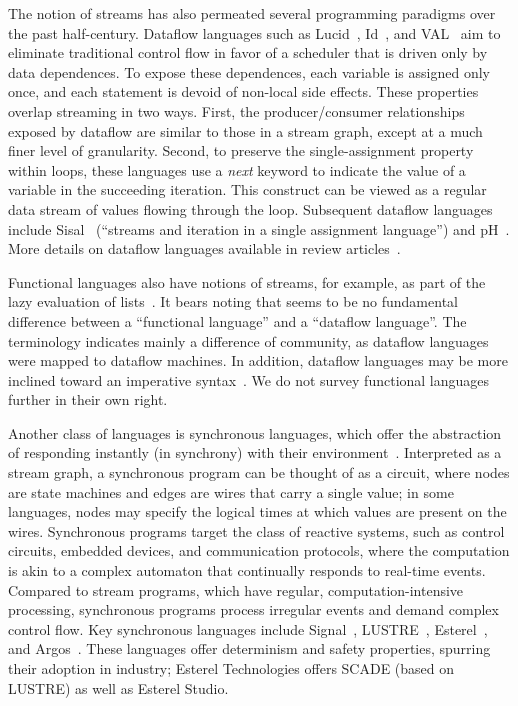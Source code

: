 The notion of streams has also permeated several programming paradigms
over the past half-century.  Dataflow languages such as
Lucid~\cite{ashcroft_lucidnonprocedural_1977},
Id~\cite{arvind_asynchronous_1978,nikhil_id_1991}, and
VAL~\cite{ackerman_VAL--value-oriented_1979} aim to eliminate
traditional control flow in favor of a scheduler that is driven only
by data dependences.  To expose these dependences, each variable is
assigned only once, and each statement is devoid of non-local side
effects.  These properties overlap streaming in two ways.  First, the
producer/consumer relationships exposed by dataflow are similar to
those in a stream graph, except at a much finer level of granularity.
Second, to preserve the single-assignment property within loops, these
languages use a {\it next} keyword to indicate the value of a variable
in the succeeding iteration.  This construct can be viewed as a
regular data stream of values flowing through the loop.  Subsequent
dataflow languages include Sisal~\cite{mcgraw_sisal:_1985} (``streams
and iteration in a single assignment language'')
and pH~\cite{nikhil_implicit_2001}.
More details on dataflow languages available in review
articles~\cite{johnston_advances_2004,stephens_survey_1997}.

Functional languages also have notions of streams, for example, as
part of the lazy evaluation of lists~\cite{henderson_lazy_1976}.  It
bears noting that seems to be no fundamental difference between a
``functional language'' and a ``dataflow language''.  The terminology
indicates mainly a difference of community, as dataflow languages were
mapped to dataflow machines.  In addition, dataflow languages may be
more inclined toward an imperative
syntax~\cite{johnston_advances_2004}.  We do not survey functional
languages further in their own right.

Another class of languages is synchronous languages, which offer the
abstraction of responding instantly (in synchrony) with their
environment~\cite{halbwachs_synchronous_1998}.  Interpreted as a
stream graph, a synchronous program can be thought of as a circuit,
where nodes are state machines and edges are wires that carry a single
value; in some languages, nodes may specify the logical times at which
values are present on the wires.  Synchronous programs target the
class of reactive systems, such as control circuits, embedded devices,
and communication protocols, where the computation is akin to a
complex automaton that continually responds to real-time events.
Compared to stream programs, which have regular, computation-intensive
processing, synchronous programs process irregular events and demand
complex control flow.  Key synchronous languages include
Signal~\cite{le_guernic_signal--data_1986},
LUSTRE~\cite{caspi_lustre:declarative_1987,halbwachs_synchronous_1991},
Esterel~\cite{berry_esterel_1992}, and
Argos~\cite{maraninchi_argos:automaton-based_2001}.  These languages offer
determinism and safety properties, spurring their adoption in
industry; Esterel Technologies offers SCADE (based on LUSTRE) as well
as Esterel Studio.

